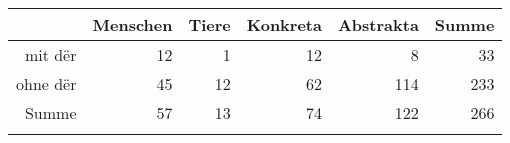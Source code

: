 \begin{tabular}{rrrrrr}
  \lsptoprule
 & Menschen & Tiere & Konkreta & Abstrakta & Summe \\ 
  \midrule
mit dër & 12 & 1 & 12 & 8 & 33 \\ 
  ohne dër & 45 & 12 & 62 & 114 & 233 \\ 
  Summe & 57 & 13 & 74 & 122 & 266 \\ 
   \lspbottomrule
\end{tabular}
